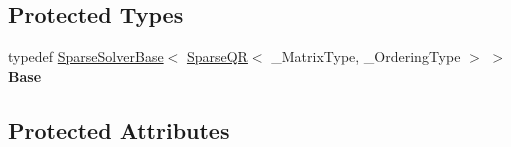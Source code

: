 \subsection*{Protected Types}
\begin{DoxyCompactItemize}
\item 
\mbox{\label{class_eigen_1_1_sparse_q_r_a552ca4344d5b520bff154f87d84f63f1}} 
typedef \mbox{\hyperlink{class_eigen_1_1_sparse_solver_base}{Sparse\+Solver\+Base}}$<$ \mbox{\hyperlink{class_eigen_1_1_sparse_q_r}{Sparse\+QR}}$<$ \+\_\+\+Matrix\+Type, \+\_\+\+Ordering\+Type $>$ $>$ {\bfseries Base}
\end{DoxyCompactItemize}
\subsection*{Protected Attributes}

